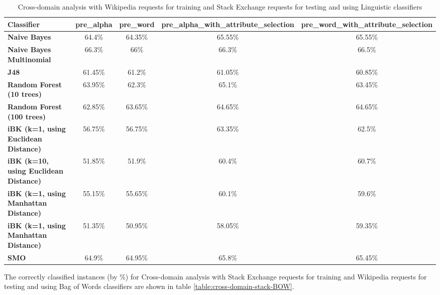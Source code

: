 \documentclass[conference]{IEEEtran}
\begin{document}
\begin{table*}[htbp]
\caption{Cross-domain analysis with Wikipedia requests for training and Stack Exchange requests for testing and using Linguistic classifiers }
\centering
\vspace{5pt}
\begin{tabular}{|l|c|c|c|c|}
\hline
\textbf{Classifier} & \textbf{pre\_alpha} & \textbf{pre\_word} & \textbf{pre\_alpha\_with\_attribute\_selection} & \textbf{pre\_word\_with\_attribute\_selection} \\
\hline\hline
\textbf{Naive Bayes} & 64.4\% & 64.35\% & 65.55\% & 65.55\% \\ 
\hline
\textbf{Naive Bayes Multinomial} & 66.3\% & 66\% & 66.3\% & 66.5\% \\ 
\hline
\textbf{J48} & 61.45\% & 61.2\% & 61.05\% & 60.85\% \\ 
\hline
\textbf{Random Forest (10 trees)} & 63.95\% & 62.3\% & 65.1\% & 63.45\% \\ 
\hline
\textbf{Random Forest (100 trees)} & 62.85\% & 63.65\% & 64.65\% & 64.65\% \\ 
\hline
\textbf{iBK (k=1, using Euclidean Distance)} & 56.75\% & 56.75\% & 63.35\% & 62.5\% \\ 
\hline
\textbf{iBK (k=10, using Euclidean Distance)} & 51.85\% & 51.9\% & 60.4\% & 60.7\% \\ 
\hline
\textbf{iBK (k=1, using Manhattan Distance)} & 55.15\% & 55.65\% & 60.1\% & 59.6\% \\ 
\hline
\textbf{iBK (k=1, using Manhattan Distance)} & 51.35\% & 50.95\% & 58.05\% & 59.35\% \\ 
\hline
\textbf{SMO} & 64.9\% & 64.95\% & 65.8\% & 65.45\% \\ 
\hline
\hline
\end{tabular}
\label{table:cross-domain-wiki-Ling}
\end{table*}

The correctly classified instances (by \%) for Cross-domain analysis with Stack Exchange requests for training and Wikipedia requests for testing and using Bag of Words classifiers are shown in table \ref{table:cross-domain-stack-BOW}.
\end{document}
